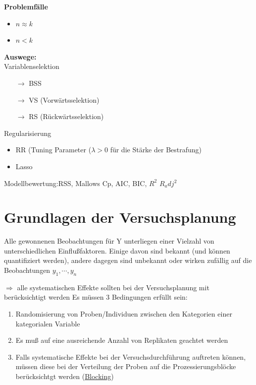 \documentclass[10pt]{report}
\theoremstyle{definition}
\begin{document}
\textbf{Problemfälle}
\begin{itemize}
	\item \(n \approx k\)
	\item \(n < k\)
\end{itemize}
\textbf{Auswege:} \\
Variablenselektion
\begin{itemize}
	\item[\(\rightarrow\)] BSS
	\item[\(\rightarrow\)] VS (Vorwärtsselektion)
	\item[\(\rightarrow\)] RS (Rückwärtsselektion)
\end{itemize}
Regularisierung
\begin{itemize}
	\item RR (Tuning Parameter (\(\lambda > 0\) für die Stärke der Bestrafung)
	\item Lasso
\end{itemize}

Modellbewertung:RSS, Mallows Cp, AIC, BIC, $R^2$ $R_adj^2$



\chapter{Grundlagen der Versuchsplanung}
Alle gewonnenen Beobachtungen für Y unterliegen einer Vielzahl von unterschiedlichen Einflußfaktoren. Einige davon sind bekannt (und können quantifiziert werden), andere dagegen sind unbekannt oder wirken zufällig auf die Beobachtungen $y_1,\cdots,y_n$ \\

$\Rightarrow$ alle systematischen Effekte sollten bei der Versuchsplanung mit berücksichtigt werden 
Es müssen 3 Bedingungen erfüllt sein:
\begin{enumerate}
	\item Randomisierung von Proben/Individuen zwischen den Kategorien einer kategorialen Variable
	\item Es muß auf eine ausreichende Anzahl von Replikaten geachtet werden
	\item Falls systematische Effekte bei der Versuchsdurchführung auftreten können, müssen diese bei der Verteilung der Proben auf die Prozessierungsblöcke berücksichtgt werden (\underline{Blocking})
\end{enumerate}
\end{document}
